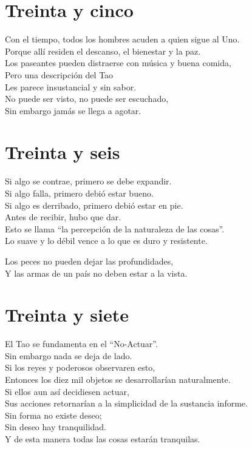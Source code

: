 \documentclass[book,b5paper,hidelinks,final]{memoir}
\begin{document}
	\chapter*{Treinta y cinco}
	
	Con el tiempo, todos los hombres acuden a quien sigue al Uno.\\
	Porque allí residen el descanso, el bienestar y la paz.\\
	Los paseantes pueden distraerse con música y buena comida,\\
	Pero una descripción del Tao\\
	Les parece insustancial y sin sabor.\\
	No puede ser visto, no puede ser escuchado,\\
	Sin embargo jamás se llega a agotar.
	
	\chapter*{Treinta y seis}
	
	Si algo se contrae, primero se debe expandir.\\
	Si algo falla, primero debió estar bueno.\\
	Si algo es derribado, primero debió estar en pie.\\
	Antes de recibir, hubo que dar.\\
	Esto se llama ``la percepción de la naturaleza de las cosas''.\\
	Lo suave y lo débil vence a lo que es duro y resistente.
	
	Los peces no pueden dejar las profundidades,\\
	Y las armas de un país no deben estar a la vista.
	
	\chapter*{Treinta y siete}
	
	El Tao se fundamenta en el ``No-Actuar''.\\
	Sin embargo nada se deja de lado.\\
	Si los reyes y poderosos observaren esto,\\
	Entonces los diez mil objetos se desarrollarían naturalmente.\\
	Si ellos aun así decidiesen actuar,\\
	Sus acciones retornarían a la simplicidad de la sustancia informe.\\
	Sin forma no existe deseo;\\
	Sin deseo hay tranquilidad.\\
	Y de esta manera todas las cosas estarán tranquilas.
	
\end{document}
